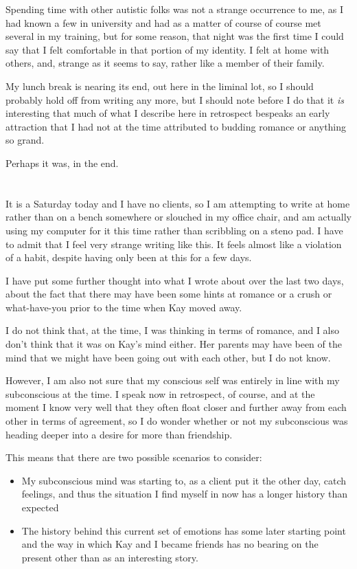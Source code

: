 Spending time with other autistic folks was not a strange occurrence to me, as I had known a few in university and had as a matter of course of course met several in my training, but for some reason, that night was the first time I could say that I felt comfortable in that portion of my identity. I felt at home with others, and, strange as it seems to say, rather like a member of their family.

My lunch break is nearing its end, out here in the liminal lot, so I should probably hold off from writing any more, but I should note before I do that it \emph{is} interesting that much of what I describe here in retrospect bespeaks an early attraction that I had not at the time attributed to budding romance or anything so grand.

Perhaps it was, in the end.

\section{}

It is a Saturday today and I have no clients, so I am attempting to write at home rather than on a bench somewhere or slouched in my office chair, and am actually using my computer for it this time rather than scribbling on a steno pad. I have to admit that I feel very strange writing like this. It feels almost like a violation of a habit, despite having only been at this for a few days.

I have put some further thought into what I wrote about over the last two days, about the fact that there may have been some hints at romance or a crush or what-have-you prior to the time when Kay moved away.

I do not think that, at the time, I was thinking in terms of romance, and I also don't think that it was on Kay's mind either. Her parents may have been of the mind that we might have been going out with each other, but I do not know.

However, I am also not sure that my conscious self was entirely in line with my subconscious at the time. I speak now in retrospect, of course, and at the moment I know very well that they often float closer and further away from each other in terms of agreement, so I do wonder whether or not my subconscious was heading deeper into a desire for more than friendship.

This means that there are two possible scenarios to consider:

\begin{itemize}
\tightlist
\item
  My subconscious mind was starting to, as a client put it the other day, catch feelings, and thus the situation I find myself in now has a longer history than expected
\item
  The history behind this current set of emotions has some later starting point and the way in which Kay and I became friends has no bearing on the present other than as an interesting story.
\end{itemize}

